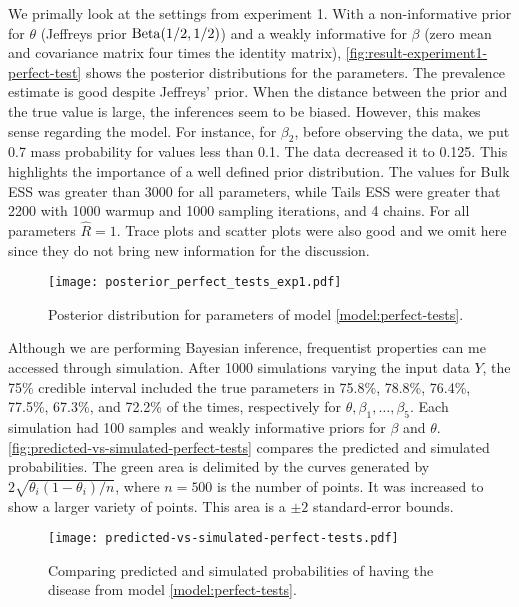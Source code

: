 We primally look at the settings from experiment 1. With a non-informative prior for $\theta$
(Jeffreys prior $\operatorname{Beta}(1/2, 1/2)$) and a weakly informative for $\beta$
(zero mean and covariance matrix four times the identity matrix),
\autoref{fig:result-experiment1-perfect-test} shows the posterior
distributions for the parameters. The prevalence estimate is good despite
Jeffreys' prior. When the distance between the prior and the true value is large, the
inferences seem to be biased. However, this makes sense regarding the model. For
instance, for $\beta_2$, before observing the data, we put 0.7 mass probability
for values less than 0.1. The data decreased it to 0.125. This highlights
the importance of a well defined prior distribution. The values for Bulk ESS
was greater than 3000 for all parameters, while Tails ESS were greater that
2200 with 1000 warmup and 1000 sampling iterations, and 4 chains. For all
parameters $\hat{R} = 1$. Trace plots and scatter plots were also good and we
omit here since they do not bring new information for the discussion. 

\begin{figure}[!ht]
  \centering  
  \caption{\label{fig:result-experiment1-perfect-test}Posterior
  distribution for parameters of model \eqref{model:perfect-tests}.}
  \texttt{[image: posterior\_perfect\_tests\_exp1.pdf]}
\end{figure} 

Although we are performing Bayesian inference, frequentist properties can me
accessed through simulation. After 1000 simulations varying the input data
$Y$, the 75\% credible interval included the true parameters in 75.8\%, 78.8\%,
76.4\%, 77.5\%, 67.3\%, and 72.2\% of the times, respectively for $\theta,
\beta_1, \dots, \beta_5$. Each simulation had 100 samples and weakly
informative priors for $\beta$ and $\theta$.
\autoref{fig:predicted-vs-simulated-perfect-tests} compares the predicted and
simulated probabilities. The green area is delimited by the curves generated
by $2\sqrt{\theta_i(1-\theta_i)/n}$, where $n=500$ is the number of points. 
It was increased to show a larger variety of points. This area is a $\pm 2$
standard-error bounds. 

\begin{figure}[!ht]
  \centering  
  \caption{\label{fig:predicted-vs-simulated-perfect-tests}Comparing predicted
 and simulated probabilities of having the disease from model \eqref{model:perfect-tests}.}
  \texttt{[image: predicted-vs-simulated-perfect-tests.pdf]}
\end{figure} 

